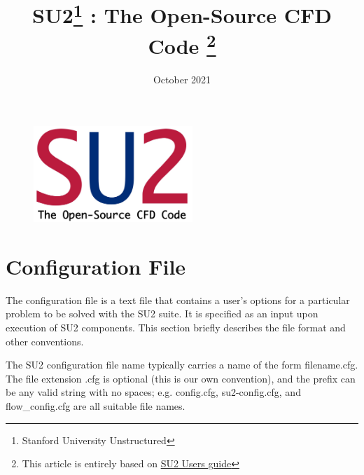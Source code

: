 \documentclass[12pt, a4paper, twoside]{article}
\title{SU2\footnote{Stanford University Unstructured} : The Open-Source CFD Code \footnote{This article is entirely based on \href{https://su2code.github.io/docs_v7/home/}{SU2 Users guide}} }
\date{October 2021}
\begin{document}
\maketitle

\begin{figure}[h!]
    \centering
\end{figure}

\newpage
{}
\begin{figure}
    \centering
    \includegraphics[width=6cm]{Figures/logoSU2_v3_3.png}
\end{figure}
    
\tableofcontents 

\newpage

\pagestyle{fancy}

\section{Configuration File}

The configuration file is a text file that contains a user’s options for a particular problem to be solved with the SU2 suite. It is specified as an input upon execution of SU2 components. This section briefly describes the file format and other conventions.

The SU2 configuration file name typically carries a name of the form filename.cfg. The file extension .cfg is optional (this is our own convention), and the prefix can be any valid string with no spaces; e.g. config.cfg, su2-config.cfg, and flow\_config.cfg are all suitable file names.
\end{document}
